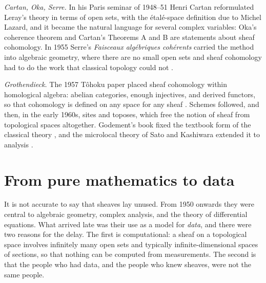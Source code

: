 \documentclass[11pt,a4paper,oneside]{scrartcl}
\theoremstyle{guideplain}
\theoremstyle{guidedef}
\begin{document}
\emph{Cartan, Oka, Serre.} In his Paris seminar of 1948--51 Henri Cartan reformulated Leray's theory
in terms of open sets, with the étalé-space definition due to Michel Lazard, and it became the
natural language for several complex variables: Oka's coherence theorem and Cartan's Theorems A and B
are statements about sheaf cohomology. In 1955 Serre's \emph{Faisceaux algébriques cohérents} carried
the method into algebraic geometry, where there are no small open sets and sheaf cohomology had to do
the work that classical topology could not \autocite{serre1955}.

\emph{Grothendieck.} The 1957 Tôhoku paper placed sheaf cohomology within homological algebra:
abelian categories, enough injectives, and derived functors, so that cohomology is defined on any
space for any sheaf \autocite{grothendieck1957}. Schemes followed, and then, in the early 1960s,
sites and toposes, which free the notion of sheaf from topological spaces altogether. Godement's
book fixed the textbook form of the classical theory \autocite{godement1958}, and the microlocal
theory of Sato and Kashiwara extended it to analysis \autocite{kashiwara1990}.

\section{From pure mathematics to data}\label{sec:applied}

It is not accurate to say that sheaves lay unused. From 1950 onwards they were central to algebraic
geometry, complex analysis, and the theory of differential equations. What arrived late was their use
as a model for \emph{data}, and there were two reasons for the delay. The first is computational: a
sheaf on a topological space involves infinitely many open sets and typically infinite-dimensional
spaces of sections, so that nothing can be computed from measurements. The second is that the
people who had data, and the people who knew sheaves, were not the same people.
\end{document}
